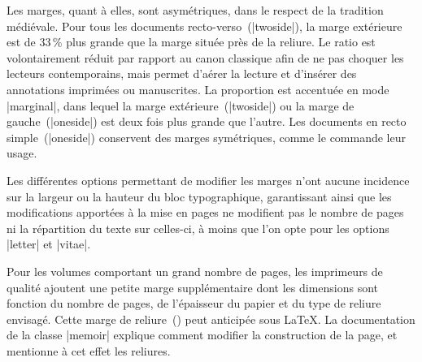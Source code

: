Les marges, quant à elles, sont asymétriques, dans le respect de la tradition médiévale. Pour tous les documents recto-verso~(|twoside|), la marge extérieure est de 33\,\% plus grande que la marge située près de la reliure. Le ratio est volontairement réduit par rapport au canon classique afin de ne pas choquer les lecteurs contemporains, mais permet d'aérer la lecture et d'insérer des annotations imprimées ou manuscrites. La proportion est accentuée en mode |marginal|, dans lequel la marge extérieure~(|twoside|) ou la marge de gauche~(|oneside|) est deux fois plus grande que l'autre. Les documents en recto simple~(|oneside|) conservent des marges symétriques, comme le commande leur usage.

Les différentes options permettant de modifier les marges n'ont aucune incidence sur la largeur ou la hauteur du bloc typographique, garantissant ainsi que les modifications apportées à la mise en pages ne modifient pas le nombre de pages ni la répartition du texte sur celles-ci, à moins que l'on opte pour les options |letter| et |vitae|.

Pour les volumes comportant un grand nombre de pages, les imprimeurs de qualité ajoutent une petite marge supplémentaire dont les dimensions sont fonction du nombre de pages, de l'épaisseur du papier et du type de reliure envisagé. Cette marge de reliure~() peut anticipée sous \LaTeX. La documentation de la classe |memoir| explique comment modifier la construction de la page, et mentionne à cet effet les reliures.

